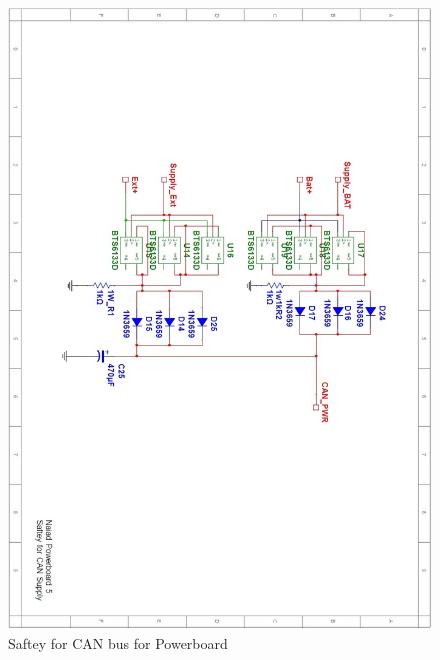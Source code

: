 \begin{figure}[!ht]
	\begin{center}
		\includegraphics[width=13.2cm]{./Images/Powerboard_Scematics/Saftey_CAN.jpg}
		\caption{Saftey for CAN bus for Powerboard}
	\end{center}
\end{figure}

